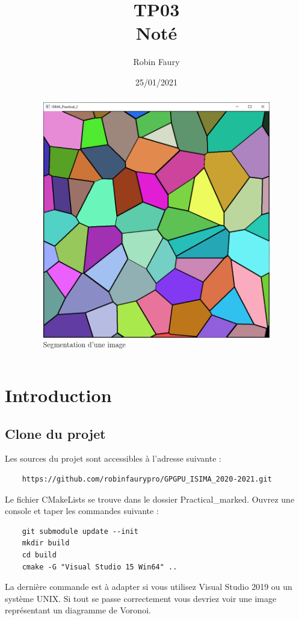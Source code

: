 \documentclass{article}
\begin{document}
\title{TP03\\Noté}
\author{Robin Faury}
\date{25/01/2021}
\maketitle

\begin{abstract}
	\begin{figure}[H]
		\centering
		\includegraphics[scale=0.6]{images/intro.png}
		\caption{Segmentation d'une image}
	\end{figure}
\end{abstract}

\newpage
\section{Introduction}
\subsection{Clone du projet}
Les sources du projet sont accessibles à l'adresse suivante :
\begin{lstlisting}
	https://github.com/robinfaurypro/GPGPU_ISIMA_2020-2021.git
\end{lstlisting}
Le fichier CMakeLists se trouve dans le dossier Practical\_marked. Ouvrez une console et taper les commandes suivante :
\begin{lstlisting}
	git submodule update --init
	mkdir build
	cd build
	cmake -G "Visual Studio 15 Win64" ..
\end{lstlisting}
La dernière commande est à adapter si vous utilisez Visual Studio 2019 ou un système UNIX.
Si tout se passe correctement vous devriez voir une image représentant un diagramme de Voronoi.
\end{document}
